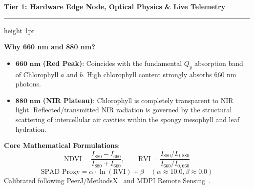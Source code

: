 \documentclass[11pt,a4paper,landscape]{article}
\begin{document}
\newpage
\begin{center}
    {\Large \textbf{\color{primary} Tier 1: Hardware Edge Node, Optical Physics \& Live Telemetry}}
\end{center}
\vspace{0.2cm}
\hrule height 1pt \color{primary}
\vspace{0.4cm}

\begin{minipage}[t]{0.48\textwidth}
\begin{tcolorbox}[colback=white,colframe=primary,title=\textbf{Dual-Wavelength Optical Physics},arc=2mm]
\textbf{Why 660 nm and 880 nm?}
\begin{itemize}[leftmargin=*]
    \item $\mathbf{660\text{ nm}}$ \textbf{(Red Peak)}: Coincides with the fundamental $Q_y$ absorption band of Chlorophyll $a$ and $b$. High chlorophyll content strongly absorbs $660\text{ nm}$ photons.
    \item $\mathbf{880\text{ nm}}$ \textbf{(NIR Plateau)}: Chlorophyll is completely transparent to NIR light. Reflected/transmitted NIR radiation is governed by the structural scattering of intercellular air cavities within the spongy mesophyll and leaf hydration.
\end{itemize}

\textbf{Core Mathematical Formulations}:
\begin{equation*}
    \text{NDVI} = \frac{I_{880} - I_{660}}{I_{880} + I_{660}}, \qquad \text{RVI} = \frac{I_{880} / I_{0,880}}{I_{660} / I_{0,660}}
\end{equation*}
\begin{equation*}
    \text{SPAD Proxy} = \alpha \cdot \ln(\text{RVI}) + \beta \quad (\alpha \approx 10.0, \beta \approx 0.0)
\end{equation*}
Calibrated following PeerJ/MethodsX~\cite{methodsx2024coffee} and MDPI Remote Sensing~\cite{zhang2022spad}.
\end{tcolorbox}
\end{minipage}
\hfill
\end{document}
